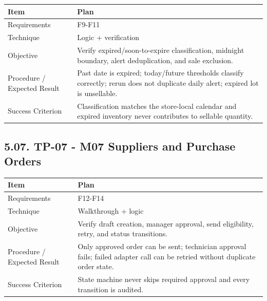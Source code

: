 {\def\LTcaptype{none} %
\begin{longtable}[]{|
  >{\raggedright\arraybackslash}m{}|
  >{\raggedright\arraybackslash}m{}|}
\hline
\begin{minipage}[c]{\linewidth}\raggedright
\textbf{Item}
\end{minipage} & \begin{minipage}[c]{\linewidth}\raggedright
\textbf{Plan}
\end{minipage} \\
\hline
\endhead

\endlastfoot
Requirements & F9-F11 \\ \hline
Technique & Logic + verification \\ \hline
Objective & Verify expired/soon-to-expire classification, midnight boundary, alert deduplication, and sale exclusion. \\ \hline
Procedure / Expected Result & Past date is expired; today/future thresholds classify correctly; rerun does not duplicate daily alert; expired lot is unsellable. \\ \hline
Success Criterion & Classification matches the store-local calendar and expired inventory never contributes to sellable quantity. \\ \hline
\end{longtable}
}

\subsection{5.07. TP-07 - M07 Suppliers and Purchase Orders}\label{tp-07---m07-suppliers-and-purchase-orders}

{\def\LTcaptype{none} %
\begin{longtable}[]{|
  >{\raggedright\arraybackslash}m{}|
  >{\raggedright\arraybackslash}m{}|}
\hline
\begin{minipage}[c]{\linewidth}\raggedright
\textbf{Item}
\end{minipage} & \begin{minipage}[c]{\linewidth}\raggedright
\textbf{Plan}
\end{minipage} \\
\hline
\endhead

\endlastfoot
Requirements & F12-F14 \\ \hline
Technique & Walkthrough + logic \\ \hline
Objective & Verify draft creation, manager approval, send eligibility, retry, and status transitions. \\ \hline
Procedure / Expected Result & Only approved order can be sent; technician approval fails; failed adapter call can be retried without duplicate order state. \\ \hline
Success Criterion & State machine never skips required approval and every transition is audited. \\ \hline
\end{longtable}
}

